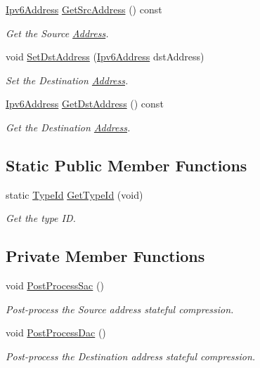 \begin{DoxyCompactItemize}
\hyperlink{classns3_1_1Ipv6Address}{Ipv6\+Address} \hyperlink{classns3_1_1SixLowPanIphc_a47fedf4531ad799d0f8d4928929573a0}{Get\+Src\+Address} () const 
\begin{DoxyCompactList}\small\item\em Get the Source \hyperlink{classns3_1_1Address}{Address}. \end{DoxyCompactList}\item 
void \hyperlink{classns3_1_1SixLowPanIphc_a9b3fafea4028bc8f41074aae87e96686}{Set\+Dst\+Address} (\hyperlink{classns3_1_1Ipv6Address}{Ipv6\+Address} dst\+Address)
\begin{DoxyCompactList}\small\item\em Set the Destination \hyperlink{classns3_1_1Address}{Address}. \end{DoxyCompactList}\item 
\hyperlink{classns3_1_1Ipv6Address}{Ipv6\+Address} \hyperlink{classns3_1_1SixLowPanIphc_a8e6a3225338dd379f033a24fcc373cef}{Get\+Dst\+Address} () const 
\begin{DoxyCompactList}\small\item\em Get the Destination \hyperlink{classns3_1_1Address}{Address}. \end{DoxyCompactList}\end{DoxyCompactItemize}
\subsection*{Static Public Member Functions}
\begin{DoxyCompactItemize}
\item 
static \hyperlink{classns3_1_1TypeId}{Type\+Id} \hyperlink{classns3_1_1SixLowPanIphc_acd85770d78bb0ee4c4e3542d0e42e185}{Get\+Type\+Id} (void)
\begin{DoxyCompactList}\small\item\em Get the type ID. \end{DoxyCompactList}\end{DoxyCompactItemize}
\subsection*{Private Member Functions}
\begin{DoxyCompactItemize}
\item 
void \hyperlink{classns3_1_1SixLowPanIphc_afe894298d67159305fca44fc2cac27ee}{Post\+Process\+Sac} ()
\begin{DoxyCompactList}\small\item\em Post-\/process the Source address stateful compression. \end{DoxyCompactList}\item 
void \hyperlink{classns3_1_1SixLowPanIphc_af830430bde1b6d7129a85bf0841e2b8b}{Post\+Process\+Dac} ()
\begin{DoxyCompactList}\small\item\em Post-\/process the Destination address stateful compression. \end{DoxyCompactList}\end{DoxyCompactItemize}
